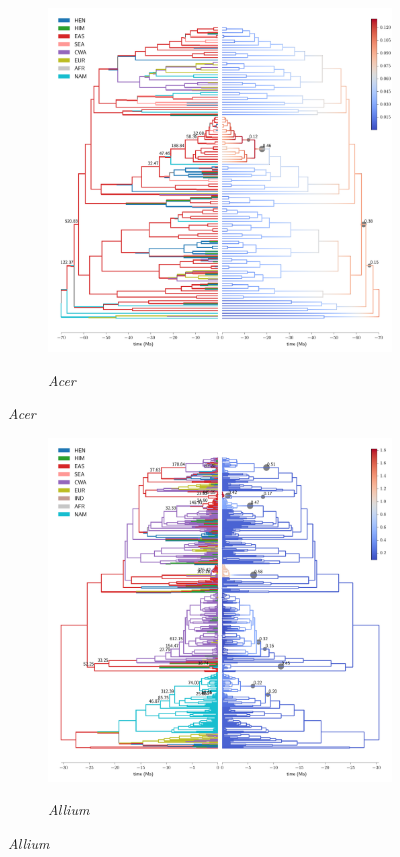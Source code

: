 \addtocounter{figure}{-1}

\begin{figure}
\begin{subfigure}{\textwidth}
\centering
\includegraphics[width=.99\linewidth]{figures/Acer-supfig.pdf}
\label{fig:acer}
\caption{\textit{Acer}}
\end{subfigure}
\end{figure}

\begin{figure}
  \ContinuedFloat
\begin{subfigure}{\textwidth}
\centering
\includegraphics[width=.99\linewidth]{figures/Allium-supfig.pdf}
\label{fig:allium}
\caption{\textit{Allium}}
\end{subfigure}
\end{figure}

